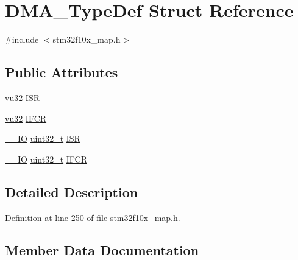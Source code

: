 \hypertarget{struct_d_m_a___type_def}{}\section{D\+M\+A\+\_\+\+Type\+Def Struct Reference}
\label{struct_d_m_a___type_def}


{\ttfamily \#include $<$stm32f10x\+\_\+map.\+h$>$}

\subsection*{Public Attributes}
\begin{DoxyCompactItemize}
\item 
\hyperlink{agilefox_2library_2inc_2stm32f10x__type_8h_a6e2761f0a1011f84ed96b946f2c8a563}{vu32} \hyperlink{struct_d_m_a___type_def_a2ea3ae3917ec07762fc81de349981c85}{I\+SR}
\item 
\hyperlink{agilefox_2library_2inc_2stm32f10x__type_8h_a6e2761f0a1011f84ed96b946f2c8a563}{vu32} \hyperlink{struct_d_m_a___type_def_a836f5a978e515ab3dc3f975f36aa7824}{I\+F\+CR}
\item 
\hyperlink{group___c_m_s_i_s___c_m3__core__definitions_gaec43007d9998a0a0e01faede4133d6be}{\+\_\+\+\_\+\+IO} \hyperlink{_p_e___types_8h_a33594304e786b158f3fb30289278f5af}{uint32\+\_\+t} \hyperlink{struct_d_m_a___type_def_aa341a859df2f59bf6c0f7a000ab8734b}{I\+SR}
\item 
\hyperlink{group___c_m_s_i_s___c_m3__core__definitions_gaec43007d9998a0a0e01faede4133d6be}{\+\_\+\+\_\+\+IO} \hyperlink{_p_e___types_8h_a33594304e786b158f3fb30289278f5af}{uint32\+\_\+t} \hyperlink{struct_d_m_a___type_def_a30576220ca1968e61666d92092e8911e}{I\+F\+CR}
\end{DoxyCompactItemize}


\subsection{Detailed Description}


Definition at line 250 of file stm32f10x\+\_\+map.\+h.



\subsection{Member Data Documentation}
